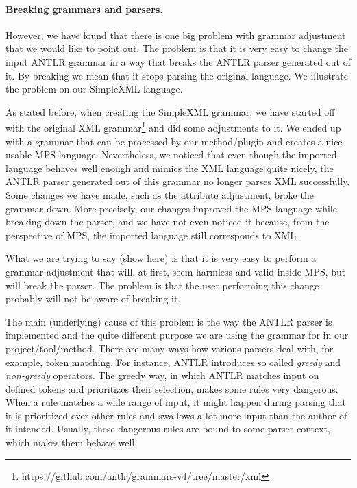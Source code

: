 \paragraph{Breaking grammars and parsers.}
However, we have found that there is one big problem with grammar adjustment that we would like to point out.
The problem is that it is very easy to change the input ANTLR grammar in a way that breaks the ANTLR parser generated out of it.
By breaking we mean that it stops parsing the original language.
We illustrate the problem on our SimpleXML language.

As stated before, when creating the SimpleXML grammar, we have started off with the original XML grammar\footnote{https://github.com/antlr/grammars-v4/tree/master/xml} and did some adjustments to it.
We ended up with a grammar that can be processed by our method/plugin and creates a nice usable MPS language.
Nevertheless, we noticed that even though the imported language behaves well enough and mimics the XML language quite nicely, the ANTLR parser generated out of this grammar no longer parses XML successfully.
Some changes we have made, such as the attribute adjustment, broke the grammar down.
More precisely, our changes improved the MPS language while breaking down the parser, and we have not even noticed it because, from the perspective of MPS, the imported language still corresponds to XML.

What we are trying to say (show here) is that it is very easy to perform a grammar adjustment that will, at first, seem harmless and valid inside MPS, but will break the parser.
The problem is that the user performing this change probably will not be aware of breaking it.

The main (underlying) cause of this problem is the way the ANTLR parser is implemented and the quite different purpose we are using the grammar for in our project/tool/method.
There are many ways how various parsers deal with, for example, token matching.
For instance, ANTLR introduces so called \emph{greedy} and \emph{non-greedy} operators.
The greedy way, in which ANTLR matches input on defined tokens and prioritizes their selection, makes some rules very dangerous.
When a rule matches a wide range of input, it might happen during parsing that it is prioritized over other rules and swallows a lot more input than the author of it intended.
Usually, these dangerous rules are bound to some parser context, which makes them behave well.

